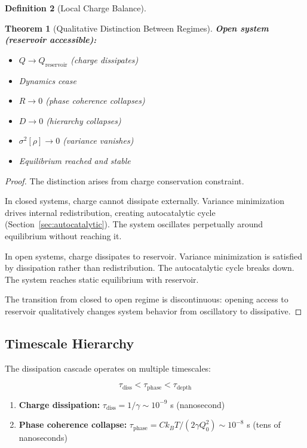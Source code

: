 \documentclass[12pt,a4paper]{article}
\theoremstyle{plain}
\newtheorem{theorem}{Theorem}[section]
\theoremstyle{definition}
\newtheorem{definition}[theorem]{Definition}
\theoremstyle{remark}
\begin{document}
\begin{definition}[Local Charge Balance]
\begin{theorem}[Qualitative Distinction Between Regimes]
\textbf{Open system (reservoir accessible):}
\begin{itemize}
\item $Q \to Q_{\text{reservoir}}$ (charge dissipates)
\item Dynamics cease
\item $R \to 0$ (phase coherence collapses)
\item $D \to 0$ (hierarchy collapses)
\item $\sigma^2[\rho] \to 0$ (variance vanishes)
\item Equilibrium reached and stable
\end{itemize}
\end{theorem}

\begin{proof}
The distinction arises from charge conservation constraint.

In closed systems, charge cannot dissipate externally. Variance minimization drives internal redistribution, creating autocatalytic cycle (Section~\ref{sec:autocatalytic}). The system oscillates perpetually around equilibrium without reaching it.

In open systems, charge dissipates to reservoir. Variance minimization is satisfied by dissipation rather than redistribution. The autocatalytic cycle breaks down. The system reaches static equilibrium with reservoir.

The transition from closed to open regime is discontinuous: opening access to reservoir qualitatively changes system behavior from oscillatory to dissipative.
\end{proof}

\subsection{Timescale Hierarchy}

The dissipation cascade operates on multiple timescales:

\begin{equation}
\tau_{\text{diss}} < \tau_{\text{phase}} < \tau_{\text{depth}}
\end{equation}

\begin{enumerate}
\item \textbf{Charge dissipation:} $\tau_{\text{diss}} = 1/\gamma \sim 10^{-9}$ s (nanosecond)

\item \textbf{Phase coherence collapse:} $\tau_{\text{phase}} = C k_B T / (2 \gamma Q_0^2) \sim 10^{-8}$ s (tens of nanoseconds)


\end{enumerate}
\end{definition}
\end{document}

